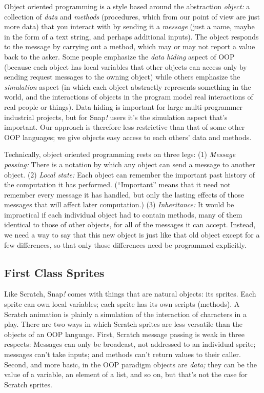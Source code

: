 Object oriented programming is a style based around the abstraction
\emph{object:} a collection of \emph{data} and \emph{methods}
(procedures, which from our point of view are just more data) that you
interact with by sending it a \emph{message} (just a name, maybe in the
form of a text string, and perhaps additional inputs). The object
responds to the message by carrying out a method, which may or may not
report a value back to the asker. Some people emphasize the \emph{data
hiding} aspect of OOP (because each object has local variables that
other objects can access only by sending request messages to the owning
object) while others emphasize the \emph{simulation} aspect (in which
each object abstractly represents something in the world, and the
interactions of objects in the program model real interactions of real
people or things). Data hiding is important for large multi-programmer
industrial projects, but for Snap\emph{!} users it's the simulation
aspect that's important. Our approach is therefore less restrictive than
that of some other OOP languages; we give objects easy access to each
others' data and methods.

Technically, object oriented programming rests on three legs: (1)
\emph{Message passing:} There is a notation by which any object can send
a message to another object. (2) \emph{Local state:} Each object can
remember the important past history of the computation it has performed.
(``Important'' means that it need not remember every message it has
handled, but only the lasting effects of those messages that will affect
later computation.) (3) \emph{Inheritance:} It would be impractical if
each individual object had to contain methods, many of them identical to
those of other objects, for all of the messages it can accept. Instead,
we need a way to say that this new object is just like that old object
except for a few differences, so that only those differences need be
programmed explicitly.

\subsection{\texorpdfstring{ First Class
Sprites}{ First Class Sprites}}\label{first-class-sprites}

Like Scratch, Snap\emph{!} comes with things that are natural objects:
its sprites. Each sprite can own local variables; each sprite has its
own scripts (methods). A Scratch animation is plainly a simulation of
the interaction of characters in a play. There are two ways in which
Scratch sprites are less versatile than the objects of an OOP language.
First, Scratch message passing is weak in three respects: Messages can
only be broadcast, not addressed to an individual sprite; messages can't
take inputs; and methods can't return values to their caller. Second,
and more basic, in the OOP paradigm objects are \emph{data;} they can be
the value of a variable, an element of a list, and so on, but that's not
the case for Scratch sprites.

